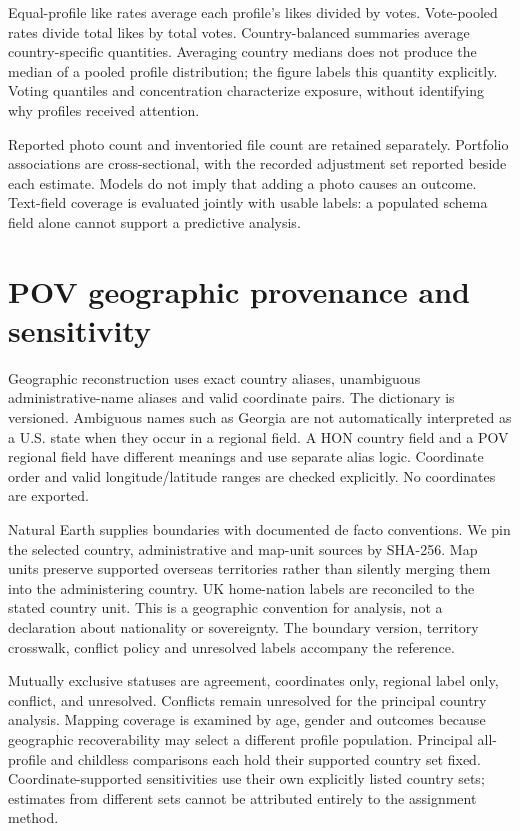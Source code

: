 Equal-profile like rates average each profile's likes divided by votes. Vote-pooled rates divide total likes by total votes. Country-balanced summaries average country-specific quantities. Averaging country medians does not produce the median of a pooled profile distribution; the figure labels this quantity explicitly. Voting quantiles and concentration characterize exposure, without identifying why profiles received attention.

Reported photo count and inventoried file count are retained separately. Portfolio associations are cross-sectional, with the recorded adjustment set reported beside each estimate. Models do not imply that adding a photo causes an outcome. Text-field coverage is evaluated jointly with usable labels: a populated schema field alone cannot support a predictive analysis.




\section{POV geographic provenance and sensitivity}

Geographic reconstruction uses exact country aliases, unambiguous administrative-name aliases and valid coordinate pairs. The dictionary is versioned. Ambiguous names such as Georgia are not automatically interpreted as a U.S. state when they occur in a regional field. A HON country field and a POV regional field have different meanings and use separate alias logic. Coordinate order and valid longitude/latitude ranges are checked explicitly. No coordinates are exported.

Natural Earth supplies boundaries with documented de facto conventions. We pin the selected country, administrative and map-unit sources by SHA-256. Map units preserve supported overseas territories rather than silently merging them into the administering country. UK home-nation labels are reconciled to the stated country unit. This is a geographic convention for analysis, not a declaration about nationality or sovereignty. The boundary version, territory crosswalk, conflict policy and unresolved labels accompany the reference.

Mutually exclusive statuses are agreement, coordinates only, regional label only, conflict, and unresolved. Conflicts remain unresolved for the principal country analysis. Mapping coverage is examined by age, gender and outcomes because geographic recoverability may select a different profile population. Principal all-profile and childless comparisons each hold their supported country set fixed. Coordinate-supported sensitivities use their own explicitly listed country sets; estimates from different sets cannot be attributed entirely to the assignment method.

